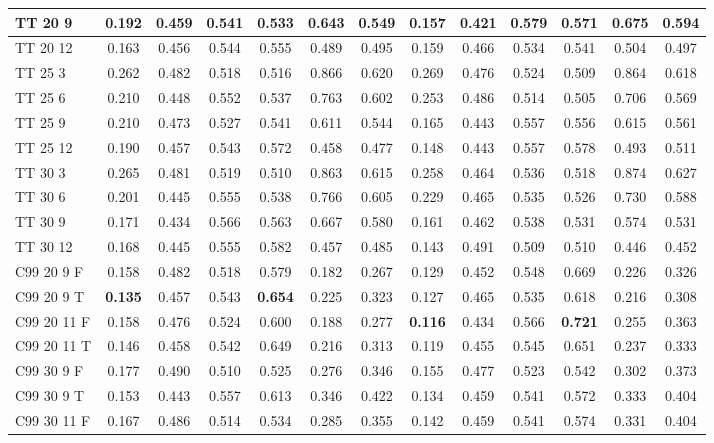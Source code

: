 \documentclass{article}
\begin{document}
\begin{tabular}{|l|c|c|c|c|c|c||c|c|c|c|c|c|}
TT 20  9 & 0.192 & 0.459 & 0.541 & 0.533 & 0.643 & 0.549 & 0.157 & 0.421 & 0.579 & 0.571 & 0.675 & 0.594\\ \hline
TT 20 12 & 0.163 & 0.456 & 0.544 & 0.555 & 0.489 & 0.495 & 0.159 & 0.466 & 0.534 & 0.541 & 0.504 & 0.497\\ \hline
TT 25  3 & 0.262 & 0.482 & 0.518 & 0.516 & 0.866 & 0.620 & 0.269 & 0.476 & 0.524 & 0.509 & 0.864 & 0.618\\ \hline
TT 25  6 & 0.210 & 0.448 & 0.552 & 0.537 & 0.763 & 0.602 & 0.253 & 0.486 & 0.514 & 0.505 & 0.706 & 0.569\\ \hline
TT 25  9 & 0.210 & 0.473 & 0.527 & 0.541 & 0.611 & 0.544 & 0.165 & 0.443 & 0.557 & 0.556 & 0.615 & 0.561\\ \hline
TT 25 12 & 0.190 & 0.457 & 0.543 & 0.572 & 0.458 & 0.477 & 0.148 & 0.443 & 0.557 & 0.578 & 0.493 & 0.511\\ \hline
TT 30  3 & 0.265 & 0.481 & 0.519 & 0.510 & 0.863 & 0.615 & 0.258 & 0.464 & 0.536 & 0.518 & 0.874 & 0.627\\ \hline
TT 30  6 & 0.201 & 0.445 & 0.555 & 0.538 & 0.766 & 0.605 & 0.229 & 0.465 & 0.535 & 0.526 & 0.730 & 0.588\\ \hline
TT 30  9 & 0.171 & 0.434 & 0.566 & 0.563 & 0.667 & 0.580 & 0.161 & 0.462 & 0.538 & 0.531 & 0.574 & 0.531\\ \hline
TT 30 12 & 0.168 & 0.445 & 0.555 & 0.582 & 0.457 & 0.485 & 0.143 & 0.491 & 0.509 & 0.510 & 0.446 & 0.452\\ \hline\hline
C99 20  9 F & 0.158 & 0.482 & 0.518 & 0.579 & 0.182 & 0.267 & 0.129 & 0.452 & 0.548 & 0.669 & 0.226 & 0.326\\ \hline
C99 20  9 T & \textbf{0.135} & 0.457 & 0.543 & \textbf{0.654} & 0.225 & 0.323 & 0.127 & 0.465 & 0.535 & 0.618 & 0.216 & 0.308\\ \hline
C99 20 11 F & 0.158 & 0.476 & 0.524 & 0.600 & 0.188 & 0.277 & \textbf{0.116} & 0.434 & 0.566 & \textbf{0.721} & 0.255 & 0.363\\ \hline
C99 20 11 T & 0.146 & 0.458 & 0.542 & 0.649 & 0.216 & 0.313 & 0.119 & 0.455 & 0.545 & 0.651 & 0.237 & 0.333\\ \hline
C99 30  9 F & 0.177 & 0.490 & 0.510 & 0.525 & 0.276 & 0.346 & 0.155 & 0.477 & 0.523 & 0.542 & 0.302 & 0.373\\ \hline
C99 30  9 T & 0.153 & 0.443 & 0.557 & 0.613 & 0.346 & 0.422 & 0.134 & 0.459 & 0.541 & 0.572 & 0.333 & 0.404\\ \hline
C99 30 11 F & 0.167 & 0.486 & 0.514 & 0.534 & 0.285 & 0.355 & 0.142 & 0.459 & 0.541 & 0.574 & 0.331 & 0.404\\ \hline

\end{tabular}
\end{document}

